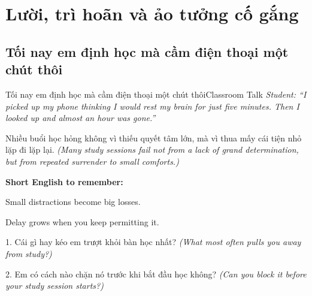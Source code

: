 \chapter{Lười, trì hoãn và ảo tưởng cố gắng}

\section{Tối nay em định học mà cầm điện thoại một chút thôi}
\begin{truyen}{Tối nay em định học mà cầm điện thoại một chút thôi}{Classroom Talk}
\textit{Student: ``I picked up my phone thinking I would rest my brain for just five minutes. Then I looked up and almost an hour was gone.''}\\[4pt]



\end{truyen}

\begin{baihoc}
Nhiều buổi học hỏng không vì thiếu quyết tâm lớn, mà vì thua mấy cái tiện nhỏ lặp đi lặp lại.
\textit{(Many study sessions fail not from a lack of grand determination, but from repeated surrender to small comforts.)}
\end{baihoc}

\begin{ghinhoanh}
\textbf{Short English to remember:}

Small distractions become big losses.

Delay grows when you keep permitting it.
\end{ghinhoanh}

\begin{tuhocnhanh}
1. Cái gì hay kéo em trượt khỏi bàn học nhất? \textit{(What most often pulls you away from study?)}

2. Em có cách nào chặn nó trước khi bắt đầu học không? \textit{(Can you block it before your study session starts?)}
\end{tuhocnhanh}
\ngancach

